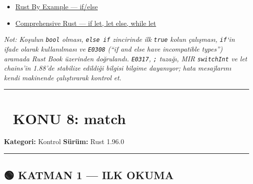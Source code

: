 \documentclass[12pt,a4paper]{article}
\begin{document}
\begin{itemize}
\tightlist
\item
  \href{https://doc.rust-lang.org/rust-by-example/flow_control/if_else.html}{Rust By Example --- if/else}
\item
  \href{https://google.github.io/comprehensive-rust/pl/pattern-matching/let-control-flow.html}{Comprehensive Rust --- if let, let else, while let}
\end{itemize}

\emph{Not: Koşulun \texttt{bool} olması, \texttt{else\ if} zincirinde ilk \texttt{true} kolun çalışması, \texttt{if}`in ifade olarak kullanılması ve \texttt{E0308} (``if and else have incompatible types'') aramada Rust Book üzerinden doğrulandı. \texttt{E0317}, \texttt{;} tuzağı, MIR \texttt{switchInt} ve let chains'in 1.88'de stabilize edildiği bilgisi bilgime dayanıyor; hata mesajlarını kendi makinende çalıştırarak kontrol et.}

\begin{center}\rule{0.5\linewidth}{0.5pt}\end{center}

\section{📘 KONU 8: match}\label{konu-8-match}

\textbf{Kategori:} Kontrol \textbar{} \textbf{Sürüm:} Rust 1.96.0

\begin{center}\rule{0.5\linewidth}{0.5pt}\end{center}

\subsection{🟢 KATMAN 1 --- ILK OKUMA}\label{katman-1-—-ilk-okuma-7}
\end{document}
